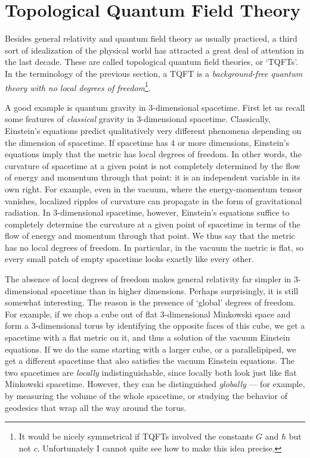 \section{Topological Quantum Field Theory} \label{TQFT}

Besides general relativity and quantum field theory as usually
practiced, a third sort of idealization of the physical world has
attracted a great deal of attention in the last decade.  These are
called topological quantum field theories, or `TQFTs'.  In the
terminology of the previous section, a TQFT is a {\it background-free
quantum theory with no local degrees of freedom}\footnote{It would be
nicely symmetrical if TQFTs involved the constants $G$ and $\hbar$ but
not $c$.  Unfortunately I cannot quite see how to make this idea precise.}.

A good example is quantum gravity in 3-dimensional spacetime.  First let
us recall some features of {\it classical} gravity in 3-dimensional
spacetime.  Classically, Einstein's equations predict qualitatively very
different phenomena depending on the dimension of spacetime.  If
spacetime has 4 or more dimensions, Einstein's equations imply that the
metric has local degrees of freedom.   In other words, the curvature of
spacetime at a given point is not completely determined by the flow of
energy and momentum through that point: it is an independent variable in
its own right.  For example, even in the vacuum, where the
energy-momentum tensor vanishes, localized ripples of curvature can
propagate in the form of gravitational radiation.  In 3-dimensional
spacetime, however, Einstein's equations suffice to completely determine
the curvature at a given point of spacetime in terms of the flow of
energy and momentum through that point.    We thus say that the metric
has no local degrees of freedom.   In particular, in the vacuum the
metric is flat, so every small patch of empty spacetime looks
exactly like every other.  

The absence of local degrees of freedom makes general relativity far
simpler in 3-dimensional spacetime than in higher dimensions. Perhaps
surprisingly, it is still somewhat interesting.  The reason is the
presence of `global' degrees of freedom.   For example, if we chop a
cube out of flat 3-dimensional Minkowski space and form a 3-dimensional
torus by identifying the opposite faces of this cube, we get a spacetime
with a flat metric on it, and thus a solution of the vacuum Einstein
equations.  If we do the same starting with a larger cube, or a
parallelipiped, we get a different spacetime that also satisfies the
vacuum Einstein equations.  The two spacetimes are {\it locally}
indistinguishable, since locally both look just like flat Minkowski
spacetime.  However, they can be distinguished {\it globally} ---  for
example, by measuring the volume of the whole spacetime, or studying
the behavior of geodesics that wrap all the way around the torus.  

